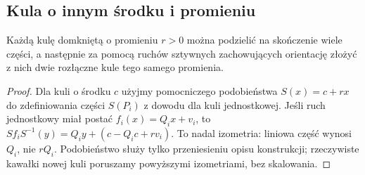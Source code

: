 \subsection{Kula o innym środku i promieniu}
\begin{wniosek}\label{wn:dowolna-kula}
Każdą kulę domkniętą o promieniu $r>0$ można podzielić na skończenie wiele części, a następnie za pomocą ruchów sztywnych zachowujących orientację złożyć z nich dwie rozłączne kule tego samego promienia.
\end{wniosek}
\begin{proof}
Dla kuli o środku $c$ użyjmy pomocniczego podobieństwa $S(x)=c+rx$ do zdefiniowania części $S(P_i)$ z dowodu dla kuli jednostkowej. Jeśli ruch jednostkowy miał postać $f_i(x)=Q_ix+v_i$, to $Sf_iS^{-1}(y)=Q_iy+(c-Q_ic+rv_i)$. To nadal izometria: liniowa część wynosi $Q_i$, nie $rQ_i$. Podobieństwo służy tylko przeniesieniu opisu konstrukcji; rzeczywiste kawałki nowej kuli poruszamy powyższymi izometriami, bez skalowania.
\end{proof}

